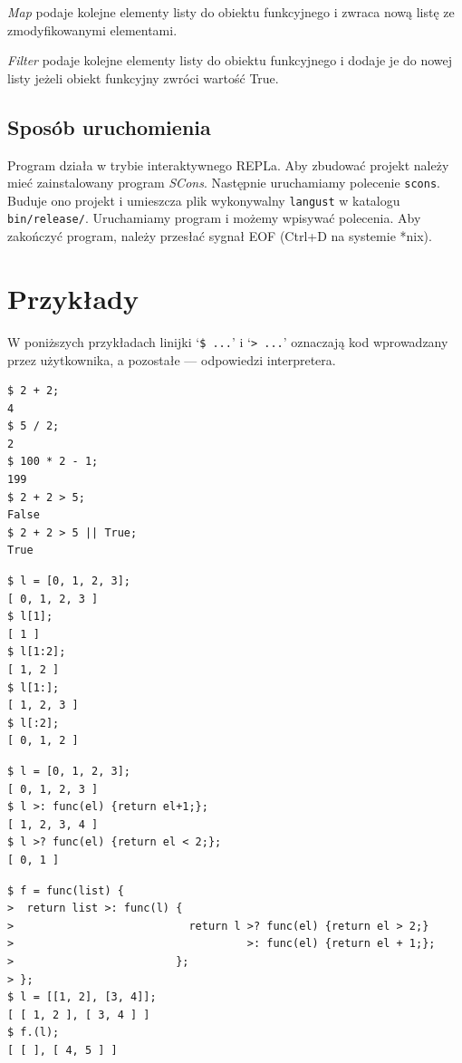 \documentclass{article}
\begin{document}
\textit{Map} podaje kolejne elementy listy do obiektu funkcyjnego
i zwraca nową listę ze zmodyfikowanymi elementami.

\textit{Filter} podaje kolejne elementy listy do obiektu funkcyjnego
i dodaje je do nowej listy jeżeli obiekt funkcyjny zwróci wartość True.

\subsection{Sposób uruchomienia}

Program działa w trybie interaktywnego REPLa. Aby zbudować projekt należy mieć zainstalowany program \emph{SCons}. Następnie uruchamiamy polecenie \texttt{scons}. Buduje ono projekt i umieszcza plik wykonywalny \texttt{langust} w katalogu \texttt{bin/release/}. Uruchamiamy program i możemy wpisywać polecenia. Aby zakończyć program, należy przesłać sygnał EOF (Ctrl+D na systemie *nix).

\section{Przykłady}
W poniższych przykładach linijki `\verb|$ ...|' i `\verb|> ...|'
oznaczają kod wprowadzany przez użytkownika, a pozostałe
--- odpowiedzi interpretera.

\begin{lstlisting}[frame=tb, title={Operacje na typach prostych}]
$ 2 + 2;
4
$ 5 / 2;
2
$ 100 * 2 - 1;
199
$ 2 + 2 > 5;
False
$ 2 + 2 > 5 || True;
True
\end{lstlisting}
\begin{lstlisting}[frame=tb, title={Pobieranie elementów listy}]
$ l = [0, 1, 2, 3];
[ 0, 1, 2, 3 ]
$ l[1];
[ 1 ]
$ l[1:2];
[ 1, 2 ]
$ l[1:];
[ 1, 2, 3 ]
$ l[:2];
[ 0, 1, 2 ]
\end{lstlisting}
\begin{lstlisting}[frame=tb, title={Operacje \textit{map} i \textit{filter}}]
$ l = [0, 1, 2, 3];
[ 0, 1, 2, 3 ]
$ l >: func(el) {return el+1;};
[ 1, 2, 3, 4 ]
$ l >? func(el) {return el < 2;};
[ 0, 1 ]
\end{lstlisting}
\break
\begin{lstlisting}[frame=tb, title={Obiekty funkcyjne}]
$ f = func(list) {
>  return list >: func(l) {
>                           return l >? func(el) {return el > 2;}
>                                    >: func(el) {return el + 1;};
>                         };
> };
$ l = [[1, 2], [3, 4]];
[ [ 1, 2 ], [ 3, 4 ] ]
$ f.(l);
[ [ ], [ 4, 5 ] ]
\end{lstlisting}
\end{document}
